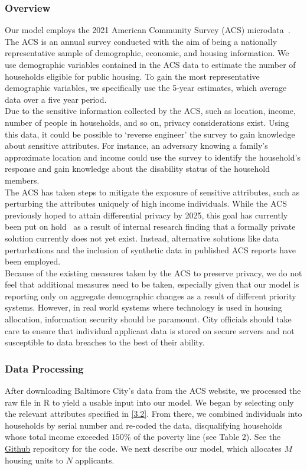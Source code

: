 \documentclass[11pt]{article}
\begin{document}
\subsubsection{Overview}Our model employs the 2021 American Community Survey (ACS) microdata~\cite{us_census_bureau_mdat_nodate}. The ACS is an annual survey conducted with the aim of being a nationally representative sample of demographic, economic, and housing information. We use demographic variables contained in the ACS data to estimate the number of households eligible for public housing. To gain the most representative demographic variables, we specifically use the 5-year estimates, which average data over a five year period. \\
\newline
Due to the sensitive information collected by the ACS, such as location, income, number of people in households, and so on, privacy considerations exist. Using this data, it could be possible to `reverse engineer' the survey to gain knowledge about sensitive attributes. For instance, an adversary knowing a family's approximate location and income could use the survey to identify the household's response and gain knowledge about the disability status of the household members. \\
\newline
The ACS has taken steps to mitigate the exposure of sensitive attributes, such as perturbing the attributes uniquely of high income individuals. While the ACS previously hoped to attain differential privacy by 2025, this goal has currently been put on hold~\cite{donna_daily_disclosure_nodate} as a result of internal research finding that a formally private solution currently does not yet exist. Instead, alternative solutions like data perturbations and the inclusion of synthetic data in published ACS reports have been employed. \\
\newline
Because of the existing measures taken by the ACS to preserve privacy, we do not feel that additional measures need to be taken, especially given that our model is reporting only on aggregate demographic changes as a result of different priority systems. However, in real world systems where technology is used in housing allocation, information security should be paramount. City officials should take care to ensure that individual applicant data is stored on secure servers and not susceptible to data breaches to the best of their ability. 
\subsubsection{Data Processing}
After downloading Baltimore City's data from the ACS website, we processed the raw file in R to yield a usable input into our model.  We began by selecting only the relevant attributes specified in \autoref{3.2}. From there, we combined individuals into households by serial number and re-coded the data, disqualifying households whose total income exceeded $150\%$ of the poverty line (see Table 2). See the \href{https://github.com/atulpokh/cpsc464final/tree/main}{Github} repository for the code.
We next describe our model, which allocates $M$ housing units to $N$ applicants. 
\end{document}
